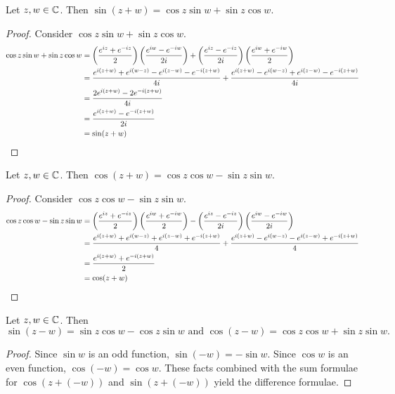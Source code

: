 \documentclass[notitlepage]{problem-solving}
\begin{document}
\begin{thm}
	Let $z,w\in\mathbb{C}$.
	Then $\sin(z+w)=\cos z\sin w+\sin z\cos w$.
\end{thm}
\begin{proof}
	Consider $\cos z\sin w+\sin z\cos w$.
	\begin{align*}
		\cos z\sin w+\sin z\cos w &=
		\left( \frac{e^{iz}+e^{-iz}}{2} \right)\left( \frac{e^{iw}-e^{-iw}}{2i} \right)+\left( \frac{e^{iz}-e^{-iz}}{2i} \right)\left( \frac{e^{iw}+e^{-iw}}{2} \right)\\
		&= \frac{e^{i(z+w)} +e^{i(w-z)} - e^{i(z-w)} - e^{-i(z+w)}}{4i} + \frac{e^{i(z+w)} -e^{i(w-z)} + e^{i(z-w)} - e^{-i(z+w)}}{4i}\\
		&= \frac{2e^{i(z+w)}-2e^{-i(z+w)}}{4i}\\
		&= \frac{e^{i(z+w)}-e^{-i(z+w)}}{2i}\\
		&= \sin(z+w)
	\end{align*}
\end{proof}

\begin{thm}
	Let $z,w\in\mathbb{C}$.
	Then $\cos(z+w)=\cos z\cos w - \sin z\sin w$.
\end{thm}
\begin{proof}
	Consider $\cos z\cos w - \sin z\sin w$.
	\begin{align*}
		\cos z\cos w - \sin z\sin w &=
		\left( \frac{e^{iz}+e^{-iz}}{2} \right)\left( \frac{e^{iw}+e^{-iw}}{2} \right) - \left( \frac{e^{iz}-e^{-iz}}{2i} \right)\left( \frac{e^{iw}-e^{-iw}}{2i} \right)\\
		&= \frac{e^{i(z+w)} + e^{i(w-z)} + e^{i(z-w)} + e^{-i(z+w)}}{4} + \frac{e^{i(z+w)} -e^{i(w-z)} - e^{i(z-w)} + e^{-i(z+w)}}{4}\\
		&= \frac{e^{i(z+w)}+e^{-i(z+w)}}{2}\\
		&= \cos(z+w)
	\end{align*}
\end{proof}

\begin{corollary}
	Let $z,w\in\mathbb{C}$.
	Then
	\[
		\sin(z-w)=\sin z\cos w - \cos z\sin w \text{ and }\cos(z-w)=\cos z\cos w + \sin z\sin w.
	\]
\end{corollary}
\begin{proof}
	Since $\sin w$ is an odd function, $\sin(-w)=-\sin w$.
	Since $\cos w$ is an even function, $\cos (-w)=\cos w$.
	These facts combined with the sum formulae for $\cos(z+(-w))$ and $\sin(z+(-w))$ yield the difference formulae.
\end{proof}

\printbibliography
\end{document}
